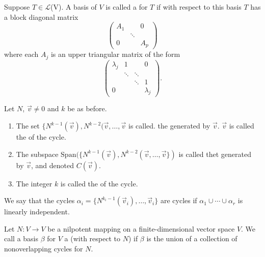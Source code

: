 \documentclass[11pt,fleqn]{book} %
\begin{document}
\begin{definition}
     Suppose $T \in \mathcal{L}$(V). A basis of $V$ is called a  for $T$ if with respect to this basis $T$ has a block diagonal matrix $$\begin{pmatrix} A_1 & &0 \\ &\ddots \\ 0 & &A_p \end{pmatrix}$$ where each $A_j$ is an upper triangular matrix of the form $$\begin{pmatrix} \lambda_j &1 & &0 \\ &\ddots &\ddots \\ & &\ddots &1 \\ 0 & & &\lambda_j \end{pmatrix}.$$
\end{definition}

\setcounter{chapter}{6}
\setcounter{section}{2}
\setcounter{definitionT}{0}
\begin{definition}[Cycle]
    Let $N$, $\vec{v} \neq 0$ and $k$ be as before.

    \begin{enumerate}[label=\alph*)]
        \item The set $\{ N^{k-1}(\vec{v}), N^{k-2}(\vec{v}, \dots, \vec{v}$ is called. the  generated by $\vec{v}$. $\vec{v}$ is called the  of the cycle.
        \item The subspace $\mathrm{Span}(\{ N^{k-1}(\vec{v}), N^{k-2}(\vec{v}, \dots, \vec{v} \})$ is called thet  generated by $\vec{v}$, and denoted $C(\vec{v})$.
        \item The integer $k$ is called the  of the cycle.
    \end{enumerate}
\end{definition}

\setcounter{definitionT}{4}
\begin{definition}
    We say that the cycles $\alpha_i = \{ N^{k_i-1}(\vec{v}_i), \dots, \vec{v}_i \}$ are  cycles if $\alpha_1 \cup \cdots \cup \alpha_r$ is linearly independent. 
\end{definition}

\setcounter{definitionT}{6}
\begin{definition}
    Let $N: V \to V$ be a nilpotent mapping on a finite-dimensional vector space $V$. We call a basis $\beta$ for $V$ a  (with respect to $N$) if $\beta$ is the union of a collection of nonoverlapping cycles for $N$.
\end{definition}
\setcounter{chapter}{4}
\end{document}
